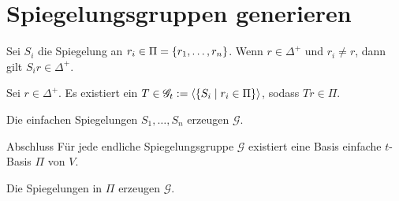 \documentclass{beamer}
\begin{document}
\section{Spiegelungsgruppen generieren}
\begin{frame}
    \begin{satz} %
        Sei \( S_i \) die Spiegelung an 
        \( r_i \in \Pi = \{r_1, \ldots, r_n\} \).
        Wenn \( r \in \Delta^+ \) und \( r_i \neq r \), 
        dann gilt \( S_i r \in \Delta^+ \).
    \end{satz}
    \pause
    \begin{satz} %
        Sei \( r \in \Delta^+ \). Es existiert ein \( T \in 
        \mathscr{G}_t := \langle 
        \{S_i \;\vert\; r_i \in \Pi\} \rangle \), sodass 
        \( Tr \in \Pi \).
    \end{satz}\pause
    \begin{satz} %
        Die einfachen Spiegelungen \( S_1, \ldots, S_n \) 
        erzeugen \( \mathscr{G} \).
    \end{satz}
\end{frame}

\begin{frame}{Abschluss}
    Für jede endliche Spiegelungsgruppe 
    \( \mathscr{G} \) existiert eine Basis 
    einfache \( t \)-Basis \( \Pi \) 
    von \( V \). 
    \pause
    
    Die Spiegelungen in 
    \( \Pi \) erzeugen \( \mathscr{G} \).
\end{frame}
\end{document}
